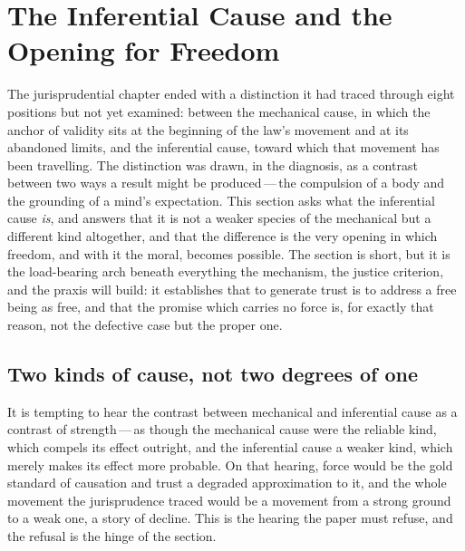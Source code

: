 \section{The Inferential Cause and the Opening for Freedom}
\label{p13:sec:freedom}

\noindent
The jurisprudential chapter ended with a distinction it had traced through eight positions but not yet examined: between the mechanical cause, in which the anchor of validity sits at the beginning of the law's movement and at its abandoned limits, and the inferential cause, toward which that movement has been travelling. The distinction was drawn, in the diagnosis, as a contrast between two ways a result might be produced\,---\,the compulsion of a body and the grounding of a mind's expectation. This section asks what the inferential cause \emph{is}, and answers that it is not a weaker species of the mechanical but a different kind altogether, and that the difference is the very opening in which freedom, and with it the moral, becomes possible. The section is short, but it is the load-bearing arch beneath everything the mechanism, the justice criterion, and the praxis will build: it establishes that to generate trust is to address a free being as free, and that the promise which carries no force is, for exactly that reason, not the defective case but the proper one.

\subsection{Two kinds of cause, not two degrees of one}
\label{p13:sub:free-twokinds}

It is tempting to hear the contrast between mechanical and inferential cause as a contrast of strength\,---\,as though the mechanical cause were the reliable kind, which compels its effect outright, and the inferential cause a weaker kind, which merely makes its effect more probable. On that hearing, force would be the gold standard of causation and trust a degraded approximation to it, and the whole movement the jurisprudence traced would be a movement from a strong ground to a weak one, a story of decline. This is the hearing the paper must refuse, and the refusal is the hinge of the section.

